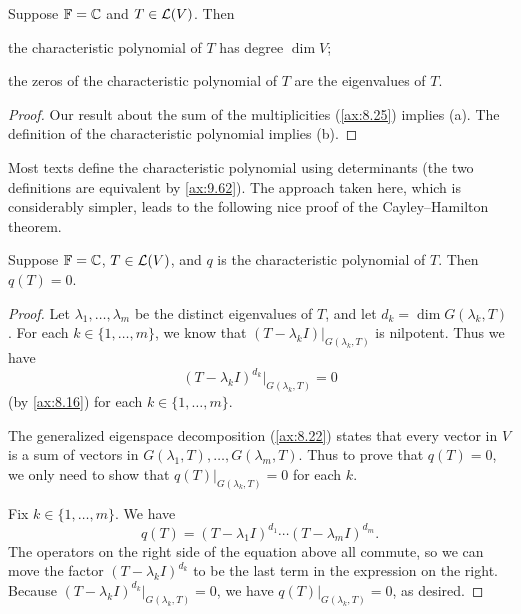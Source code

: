 \begin{result}\label{ax:8.28}
Suppose $\mathbb{F}=\mathbb{C}$ and $T\in\mathcal{L}(V)$. Then
\begin{parts}
\item the characteristic polynomial of $T$ has degree $\dim V$;
\item the zeros of the characteristic polynomial of $T$ are the eigenvalues of
  $T$.
\end{parts}
\end{result}

\begin{proof}
Our result about the sum of the multiplicities (\ref{ax:8.25}) implies (a). The
definition of the characteristic polynomial implies (b).
\end{proof}

Most texts define the characteristic polynomial using determinants (the two
definitions are equivalent by \ref{ax:9.62}). The approach taken here, which is
considerably simpler, leads to the following nice proof of the Cayley--Hamilton
theorem.

\begin{result}\label{ax:8.29}
Suppose $\mathbb{F}=\mathbb{C}$, $T\in\mathcal{L}(V)$, and $q$ is the characteristic polynomial of
$T$. Then $q(T)=0$.
\end{result}

\begin{proof}
Let $\lambda_1,\dots,\lambda_m$ be the distinct eigenvalues of $T$, and let
$d_k=\dim G(\lambda_k,T)$. For each $k\in\{1,\dots,m\}$, we know that
$(T-\lambda_kI)|_{G(\lambda_k,T)}$ is nilpotent. Thus we have
\[ (T-\lambda_kI)^{d_k}|_{G(\lambda_k,T)} = 0 \]
(by \ref{ax:8.16}) for each $k\in\{1,\dots,m\}$.

%
The generalized eigenspace decomposition (\ref{ax:8.22}) states that every
vector in $V$ is a sum of vectors in $G(\lambda_1,T),\dots,G(\lambda_m,T)$.
Thus to prove that $q(T)=0$, we only need to show that
$q(T)|_{G(\lambda_k,T)}=0$ for each $k$.

Fix $k\in\{1,\dots,m\}$. We have
\[ q(T) = (T-\lambda_1I)^{d_1}\cdots(T-\lambda_mI)^{d_m}. \]
The operators on the right side of the equation above all commute, so we can
move the factor $(T-\lambda_kI)^{d_k}$ to be the last term in the expression on
the right. Because $(T-\lambda_kI)^{d_k}|_{G(\lambda_k,T)}=0$, we have
$q(T)|_{G(\lambda_k,T)}=0$, as desired.
\end{proof}

